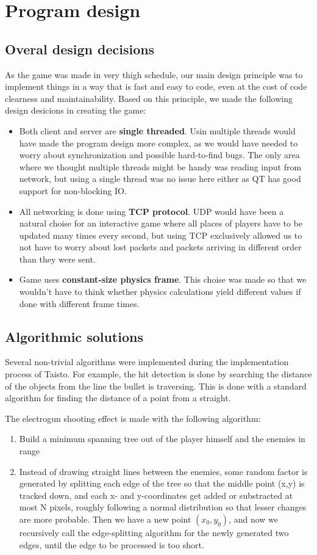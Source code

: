 \documentclass[a4paper,12pt,titlepage]{article}
\begin{document}
\section{Program design}

\subsection{Overal design decisions}

As the game was made in very thigh schedule, our main design principle was to implement things in a way that is fast and easy to code, even at the cost of code clearness and maintainability. Based on this principle, we made the following design desicions in creating the game:
\begin{itemize}
\item Both client and server are \textbf{single threaded}. Usin multiple threads would have made the program design more complex, as we would have needed to worry about synchronization and possible hard-to-find bugs. The only area where we thought multiple threads might be handy was reading input from network, but using a single thread was no issue here either as QT has good support for non-blocking IO.
\item All networking is done using \textbf{TCP protocol}. UDP would have been a natural choise for an interactive game where all places of players have to be updated many times every second, but using TCP exclusively allowed us to not have to worry about lost packets and packets arriving in different order than they were sent.
\item Game uses \textbf{constant-size physics frame}. This choise was made so that we wouldn't have to think whether physics calculations yield different values if done with different frame times.
\end{itemize}

\subsection {Algorithmic solutions}
Several non-trivial algorithms were implemented during the implementation 
process of Taisto. For example, the hit detection is done by searching the 
distance of the objects from the line the bullet is traversing. This is done
with a standard algorithm for finding the distance of a point from a straight.

The electrogun shooting effect is made with the following algorithm:
\begin{enumerate}
\item Build a minimum spanning tree out of the player himself and the enemies
in range
\item Instead of drawing straight lines between the enemies, some random factor
is generated by splitting each edge of the tree so that the middle point (x,y)
is tracked down, and each x- and y-coordinates get added or substracted at most
N pixels, roughly following a normal distribution so that lesser changes are
more probable. Then we have a new point $(x_0,y_0)$, and now we recursively
call the edge-splitting algorithm for the newly generated two edges, until the
edge to be processed is too short.
\end{enumerate}
\end{document}
